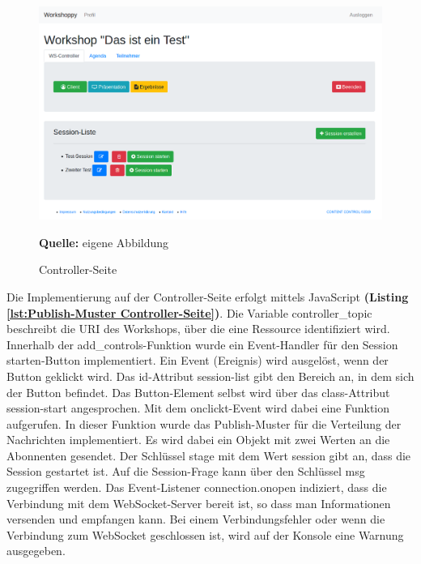 \begin{figure}[H]
  \begin{center}
    \includegraphics[scale=0.3]{img/controller-seite_real}
	\caption{Controller-Seite} 
	\footnotesize\sffamily\textbf{Quelle:} eigene Abbildung
	\label{fig:controller-Seite final}
  \end{center}   
\end{figure}

Die Implementierung auf der Controller-Seite erfolgt mittels JavaScript \textbf{(Listing \ref{lst:Publish-Muster Controller-Seite})}. Die Variable \glqq controller\_topic\grqq{} beschreibt die URI des Workshops, über die eine Ressource identifiziert wird. Innerhalb der \glqq add\_controls\grqq{}-Funktion wurde ein Event-Handler für den \glqq Session starten\grqq{}-Button implementiert. Ein Event (Ereignis) wird ausgelöst, wenn der Button geklickt wird. Das id-Attribut \glqq session-list\grqq{} gibt den Bereich an, in dem sich der Button befindet. Das Button-Element selbst wird über das class-Attribut \glqq session-start\grqq{} angesprochen. Mit dem onclickt-Event wird dabei eine Funktion aufgerufen. In dieser Funktion wurde das Publish-Muster für die Verteilung der Nachrichten implementiert. Es wird dabei ein Objekt mit zwei Werten an die Abonnenten gesendet. Der Schlüssel \glqq stage\grqq{} mit dem Wert \glqq session\grqq{} gibt an, dass die Session gestartet ist. Auf die Session-Frage kann über den Schlüssel \glqq msg\grqq{} zugegriffen werden. Das Event-Listener \glqq connection.onopen\grqq{} indiziert, dass die Verbindung mit dem WebSocket-Server bereit ist, so dass man Informationen versenden und empfangen kann. Bei einem Verbindungsfehler oder wenn die Verbindung zum WebSocket geschlossen ist, wird auf der Konsole eine Warnung ausgegeben.

